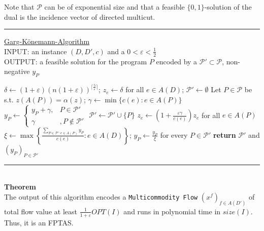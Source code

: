 \documentclass[a4paper, 12pt]{article}
\begin{document}
	Note that $\mathcal{P}$ can be of exponential size and that a feasible $\{0,1\}$-solution of the dual is the incidence vector of directed multicut.\\
	\par\noindent\rule{\textwidth}{0.4pt}
	\underline{Garg-Könemann-Algorithm}\\
	INPUT: an instance $(D,D',c)$ and a $0 < \varepsilon < \frac{1}{2}$\\
	OUTPUT: a feasible solution for the program $P$ encoded by a $\mathcal{P}' \subset \mathcal{P}$, non-negative $y_P$
	\begin{algorithmic}[1]
		\State $\delta \gets (1+\varepsilon)(n(1+\varepsilon))^{\lceil \frac{5}{\varepsilon}\rceil}$; $z_e \gets \delta$ for all $e \in A(D)$; $\mathcal{P}' \gets \emptyset$
		\State Let $P \in \mathcal{P}$ be s.t. $z(A(P)) = \alpha(z)$; $\gamma \gets \min \{c(e): e \in A(P)\}$
		\State $y_P \gets \begin{cases}
			y_P + \gamma, & P \in \mathcal{P}'\\
			\gamma&, P \notin \mathcal{P}'
		\end{cases}$
		\State $\mathcal{P}' \gets \mathcal{P}' \cup \{P\}$
		\State $z_e \gets \left(1+\frac{\varepsilon \gamma}{c(e)}\right)z_e$ for all $e \in A(P)$
		\EndWhile
		\State $\xi \gets \max \left\{\frac{\sum_{P \in \mathcal{P}': e \in A(P)}y_P}{c(e)}: e \in A(D)\right\}$; $y_P \gets \frac{y_P}{\xi}$ for every $P \in \mathcal{P}'$
		\State \textbf{return} $\mathcal{P}'$ and $(y_P)_{P \in \mathcal{P}'}$
	\end{algorithmic}
	\par\noindent\rule{\textwidth}{0.4pt}\\
	\textbf{Theorem}\\
	The output of this algorithm encodes a \texttt{Multicommodity Flow} $(x^f)_{f \in A(D')}$ of total flow value at least $\frac{1}{1+\varepsilon}OPT(I)$ and runs in polynomial time in $size(I)$. Thus, it is an FPTAS. 
\end{document}

